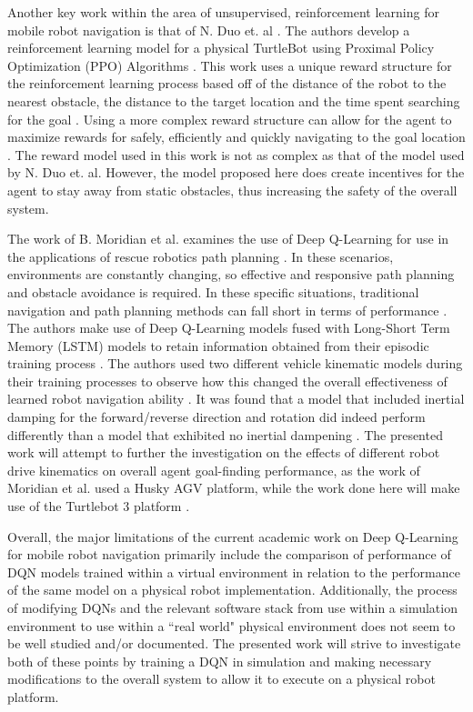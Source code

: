 \documentclass[conference]{IEEEtran}
\begin{document}
Another key work within the area of unsupervised, reinforcement learning for mobile robot navigation is that of N. Duo et. al \cite{b5}. The authors develop a reinforcement learning model for a physical TurtleBot using Proximal Policy Optimization (PPO) Algorithms \cite{b5}. This work uses a unique reward structure for the reinforcement learning process based off of the distance of the robot to the nearest obstacle, the distance to the target location and the time spent searching for the goal \cite{b5}. Using a more complex reward structure can allow for the agent to maximize rewards for safely, efficiently and quickly navigating to the goal location \cite{b5}. The reward model used in this work is not as complex as that of the model used by N. Duo et. al. However, the model proposed here does create incentives for the agent to stay away from static obstacles, thus increasing the safety of the overall system. 

The work of B. Moridian et al. examines the use of Deep Q-Learning for use in the applications of rescue robotics path planning \cite{b4}. In these scenarios, environments are constantly changing, so effective and responsive path planning and obstacle avoidance is required. In these specific situations, traditional navigation and path planning methods can fall short in terms of performance \cite{b4}. The authors make use of Deep Q-Learning models fused with Long-Short Term Memory (LSTM) models to retain information obtained from their episodic training process \cite{b4}. The authors used two different vehicle kinematic models during their training processes to observe how this changed the overall effectiveness of learned robot navigation ability \cite{b4}. It was found that a model that included inertial damping for the forward/reverse direction and rotation did indeed perform differently than a model that exhibited no inertial dampening \cite{b4}. The presented work will attempt to further the investigation on the effects of different robot drive kinematics on overall agent goal-finding performance, as the work of Moridian et al. used a Husky AGV platform, while the work done here will make use of the Turtlebot 3 platform \cite{b4}.

Overall, the major limitations of the current academic work on Deep Q-Learning for mobile robot navigation primarily include the comparison of performance of DQN models trained within a virtual environment in relation to the performance of the same model on a physical robot implementation. Additionally, the process of modifying DQNs and the relevant software stack from use within a simulation environment to use within a ``real world" physical environment does not seem to be well studied and/or documented. The presented work will strive to investigate both of these points by training a DQN in simulation and making necessary modifications to the overall system to allow it to execute on a physical robot platform. 
\end{document}
